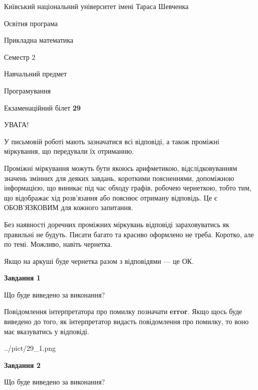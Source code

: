 \documentclass[12pt, ukrainian]{article}
\begin{document}
{{\begin {small}\par
{ \center  Київський національний університет імені Тараса Шевченка \par}
{\parbox {5 cm}{Освітня програма \hfill}{\parbox {7 cm}{Прикладна математика \hfill}}\parbox {6 cm}{\hfill Семестр 2}}\par
{\parbox {5 cm} {Навчальний предмет \hfill}\parbox {7 cm}{Програмування \hfill}\parbox {6cm}{\hfill}\par}\vspace{-7pt} \end{small}}{\center Екзаменаційний білет \No \textbf
{ 29 }\par}}
{
\begin {large}
УВАГА!

У письмовій роботі мають зазначатися всі відповіді, а також проміжні міркування, що передували їх отриманню.

Проміжні міркування можуть бути якоюсь арифметикою, відслідковуванням зна\-чень змінних для деяких завдань,
короткими поясненнями, допоміжною інформацією, що виникає під час обходу графів, робочею чернеткою,
тобто тим, що відображає хід розв’язання або пояснює отриману відповідь.
Це є ОБОВ’ЯЗКОВИМ для кожного запитання.

Без наявності доречних проміжних міркувань відповіді зараховуватись як правиль\-ні не будуть.
Писати багато та красиво оформлено не треба. Коротко, але по темі. Можли\-во, навіть чернетка.

Якщо на аркуші буде чернетка разом з відповідями --- це ОК.

\newpage

{\begin {center}\textbf{Завдання 1}\end {center}}\par
Що буде виведено за виконання?

Повідомлення інтерпретатора про помилку позначати \textbf{error}.
Якщо щось буде виведено до того, як інтерпретатор видасть повідомлення про помилку, 
то воно має вказуватись у відповіді. \par


\begin{center}
	{../pict/29_1.png}
\end{center}
\newpage

{\begin {center}\textbf{Завдання 2}\end {center}}\par
Що буде виведено за виконання?


\end{large}}
\end{document}
